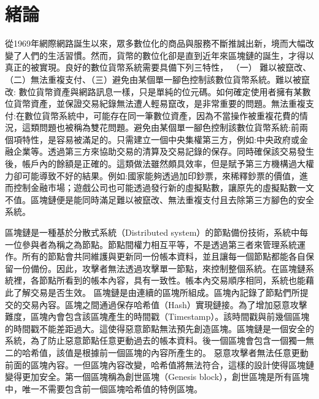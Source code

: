 
\chapter{緒論}
從1969年網際網路誕生以來，眾多數位化的商品與服務不斷推誠出新，境而大幅改變了人們的生活習慣。然而，貨幣的數位化卻是直到近年來區塊鏈的誕生，才得以真正的被實現。良好的數位貨幣系統需要具備下列三特性，
（一） 難以被竄改、（二）無法重複支付、（三）避免由某個單一腳色控制該數位貨幣系統。難以被竄改: 數位貨幣資產與網路訊息一樣，只是單純的位元碼。如何確定使用者擁有某數位貨幣資產，並保證交易紀錄無法遭人輕易竄改，是非常重要的問題。無法重複支付:在數位貨幣系統中，可能存在同一筆數位資產，因為不當操作被重複花費的情況，這類問題也被稱為雙花問題。避免由某個單一腳色控制該數位貨幣系統:前兩個項特性，是容易被滿足的。只需建立一個中央集權第三方，例如:中央政府或金融企業等。透過第三方來協助交易的清算及交易記錄的保存。同時確保該交易發生後，帳戶內的餘額是正確的。這類做法雖然頗具效率，但是賦予第三方機構過大權力卻可能導致不好的結果。例如:國家能夠透過加印鈔票，來稀釋鈔票的價值，進而控制金融市場；遊戲公司也可能透過發行新的虛擬點數，讓原先的虛擬點數一文不值。區塊鏈便是能同時滿足難以被竄改、無法重複支付且去除第三方腳色的安全系統。

區塊鏈是一種基於分散式系統（Distributed system）的節點備份技術，系統中每一位參與者為稱之為節點。節點間權力相互平等，不是透過第三者來管理系統運作。所有的節點會共同維護與更新同一份帳本資料，並且讓每一個節點都能各自保留一份備份。因此，攻擊者無法透過攻擊單一節點，來控制整個系統。在區塊鏈系統裡，各節點所看到的帳本內容，具有一致性。帳本內交易順序相同，系統也能藉此了解交易是否生效。
區塊鏈是由連續的區塊所組成。區塊內記錄了節點們所提交的交易內容。區塊之間通過保存哈希值（Hash）實現鏈接。為了增加惡意攻擊難度，區塊內會包含該區塊產生的時間戳（Timestamp）。該時間戳與前幾個區塊的時間戳不能差距過大。這使得惡意節點無法預先創造區塊。區塊鏈是一個安全的系統，為了防止惡意節點任意更動過去的帳本資料。後一個區塊會包含一個獨一無二的哈希值，該值是根據前一個區塊的內容所產生的。
惡意攻擊者無法任意更動前面的區塊內容。一但區塊內容改變，哈希值將無法符合，這樣的設計使得區塊鏈變得更加安全。第一個區塊稱為創世區塊（Genesis block），創世區塊是所有區塊中，唯一不需要包含前一個區塊哈希值的特例區塊。


